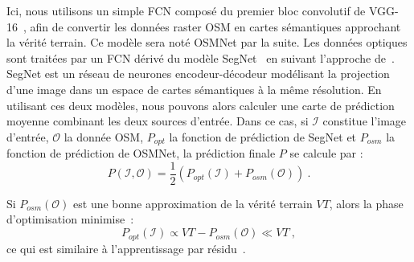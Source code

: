 Ici, nous utilisons un simple \gls{FCN} composé du premier bloc convolutif de VGG-16~\cite{simonyan_very_2014}, afin de convertir les données raster \gls{OSM} en cartes sémantiques approchant la vérité terrain. Ce modèle sera noté OSMNet par la suite. Les données optiques sont traitées par un \gls{FCN} dérivé du modèle SegNet~\cite{badrinarayanan_segnet_2017} en suivant l'approche de~\cite{audebert_semantic_2016}. SegNet est un réseau de neurones encodeur-décodeur modélisant la projection d'une image dans un espace de cartes sémantiques à la même résolution. En utilisant ces deux modèles, nous pouvons alors calculer une carte de prédiction moyenne combinant les deux sources d'entrée. Dans ce cas, si $\mathcal{I}$ constitue l'image d'entrée, $\mathcal{O}$ la donnée \gls{OSM}, $P_{opt}$ la fonction de prédiction de SegNet et $P_{osm}$ la fonction de prédiction de OSMNet, la prédiction finale $P$ se calcule par :
\begin{equation}
P(\mathcal{I}, \mathcal{O}) = \frac{1}{2} (P_{opt}(\mathcal{I}) + P_{osm}(\mathcal{O}))~.
\end{equation}

Si $P_{osm}(\mathcal{O})$ est une bonne approximation de la vérité terrain $VT$, alors la phase d'optimisation minimise~:
\begin{equation}
P_{opt}(\mathcal{I}) \propto VT - P_{osm}(\mathcal{O}) \ll VT~,
\end{equation}
ce qui est similaire à l'apprentissage par résidu~\cite{he_deep_2016}.

